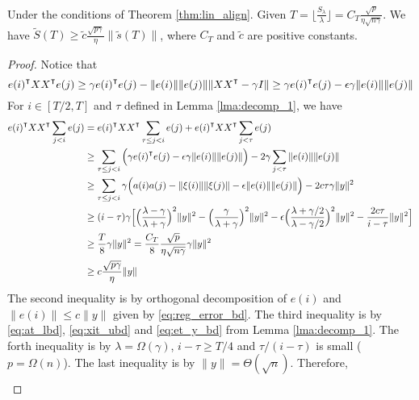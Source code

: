 \begin{lemma}
\label{lma:ST_sT}
Under the conditions of Theorem \ref{thm:lin_align}. Given $T = \lfloor \frac{S_\lambda}{\lambda} \rfloor = C_T\frac{\sqrt{p}}{\eta\sqrt{n\gamma}}$. We have $\tilde{S}(T) \geq \tilde{c}\frac{\sqrt {p\gamma}}{\eta}\|\tilde{s}(T)\|$, where $C_T$ and $\tilde{c}$ are positive constants.
\end{lemma}
\begin{proof}
Notice that
\begin{equation*}
    e(i)\transpose XX\transpose e(j) \geq \gamma e(i)\transpose e(j) - \|e(i)\|\|e(j)\|\|XX\transpose-\gamma I\| \geq \gamma e(i)\transpose e(j) - \epsilon\gamma\|e(i)\|\|e(j)\|
\end{equation*}
For $i\in[T/2,T]$ and $\tau$ defined in Lemma \ref{lma:decomp_1}, we have
\begin{equation}
\label{eq:eXXe}
\begin{aligned}
    e(i)\transpose XX\transpose \sum_{j<i}e(j) 
    &= e(i)\transpose XX\transpose \sum_{\tau\leq j<i}e(j) + e(i)\transpose XX\transpose \sum_{j<\tau}e(j) \\
    &\geq \sum_{\tau\leq j<i}\Big(\gamma e(i)\transpose e(j) - \epsilon\gamma\|e(i)\|\|e(j)\|\Big) - 2\gamma \sum_{j<\tau}\|e(i)\|\|e(j)\| \\
    &\geq \sum_{\tau\leq j<i}\gamma\Big(a(i)a(j) - \|\xi(i)\|\|\xi(j)\| - \epsilon\|e(i)\|\|e(j)\|\Big) - 2c\tau\gamma \|y\|^2 \\
    &\geq (i-\tau)\gamma\Big[\Big(\frac{\lambda-\gamma}{\lambda+\gamma}\Big)^2\|y\|^2-\Big(\frac{\gamma}{\lambda+\gamma}\Big)^2\|y\|^2-\epsilon\Big(\frac{\lambda+\gamma/2}{\lambda-\gamma/2}\Big)^2\|y\|^2- \frac{2c\tau}{i-\tau}\|y\|^2\Big] \\
    &\geq \frac{T}{8}\gamma\|y\|^2 = \frac{C_T}{8}\frac{\sqrt{p}}{\eta\sqrt{n\gamma}}\gamma\|y\|^2 \\
    &\geq c\frac{\sqrt{p\gamma}}{\eta}\|y\|
\end{aligned}
\end{equation}
The second inequality is by orthogonal decomposition of $e(i)$ and $\|e(i)\|\leq c\|y\|$ given by \eqref{eq:reg_error_bd}. The third inequality is by \eqref{eq:at_lbd}, \eqref{eq:xit_ubd} and \eqref{eq:et_y_bd} from Lemma \ref{lma:decomp_1}. The forth inequality is by $\lambda=\Omega(\gamma)$, $i-\tau \geq T/4$ and $\tau/(i-\tau)$ is small ($p=\Omega(n)$). The last inequality is by $\|y\|=\Theta(\sqrt n)$. Therefore,
\begin{equation*}
\begin{aligned}

\end{aligned}
\end{equation*}
\end{proof}
